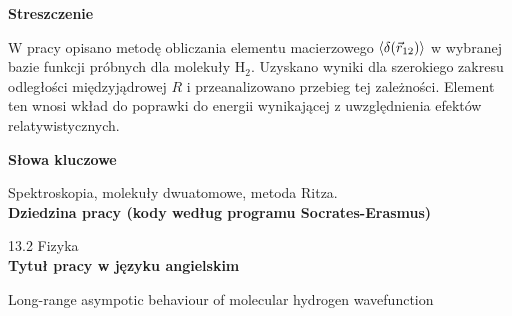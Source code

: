 \newpage
\begin{center}
\textbf{Streszczenie}
\end{center}

W pracy opisano metodę obliczania elementu macierzowego $\braket{\delta({\vec{r}_{12}})}$  w wybranej bazie funkcji próbnych dla molekuły H$_2$. Uzyskano wyniki dla szerokiego zakresu odległości międzyjądrowej $R$ i przeanalizowano przebieg tej zależności. Element ten wnosi wkład do poprawki do energii wynikającej z uwzględnienia efektów relatywistycznych.
\vspace{2.5cm}
\begin{center}
\textbf{Słowa kluczowe}\vspace{0.3cm}

Spektroskopia, molekuły dwuatomowe, metoda Ritza.\\
\vspace{2.5cm}
\textbf{Dziedzina pracy (kody według programu Socrates-Erasmus)}\vspace{0.3cm}

13.2 Fizyka\\
\vspace{2.5cm}
\textbf{Tytuł pracy w języku angielskim}\vspace{0.3cm}

Long-range asympotic behaviour of molecular hydrogen wavefunction
\end{center}

